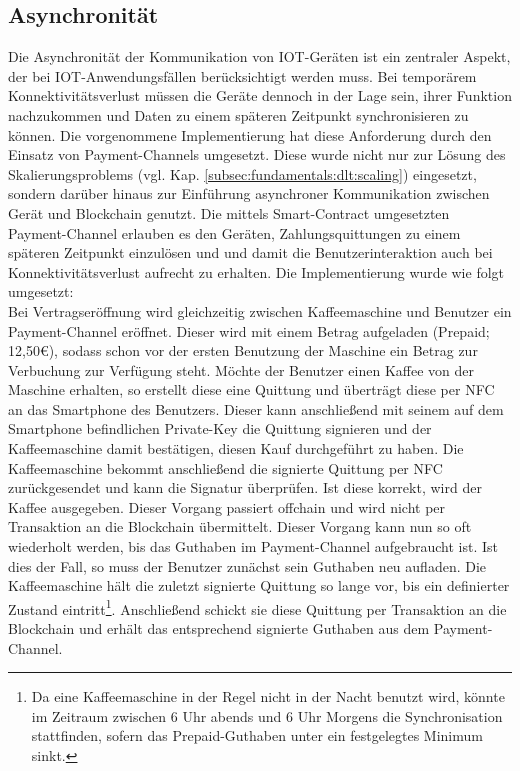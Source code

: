 \subsection{Asynchronität}
\label{subsec:implementation:requirements:async}
Die Asynchronität der Kommunikation von \ac{IOT}-Geräten ist ein zentraler Aspekt, der bei \ac{IOT}-Anwendungsfällen berücksichtigt werden muss. Bei temporärem Konnektivitätsverlust müssen die Geräte dennoch in der Lage sein, ihrer Funktion nachzukommen und Daten zu einem späteren Zeitpunkt synchronisieren zu können. Die vorgenommene Implementierung hat diese Anforderung durch den Einsatz von Payment-Channels umgesetzt. Diese wurde nicht nur zur Lösung des Skalierungsproblems (vgl. Kap. \ref{subsec:fundamentals:dlt:scaling}) eingesetzt, sondern darüber hinaus zur Einführung asynchroner Kommunikation zwischen Gerät und Blockchain genutzt. Die mittels Smart-Contract umgesetzten Payment-Channel erlauben es den Geräten, Zahlungsquittungen zu einem späteren Zeitpunkt einzulösen und und damit die Benutzerinteraktion auch bei Konnektivitätsverlust aufrecht zu erhalten. Die Implementierung wurde wie folgt umgesetzt:\\
Bei Vertragseröffnung wird gleichzeitig zwischen Kaffeemaschine und Benutzer ein Payment-Channel eröffnet. Dieser wird mit einem Betrag aufgeladen (Prepaid; 12,50€), sodass schon vor der ersten Benutzung der Maschine ein Betrag zur Verbuchung zur Verfügung steht. Möchte der Benutzer einen Kaffee von der Maschine erhalten, so erstellt diese eine Quittung und überträgt diese per \ac{NFC} an das Smartphone des Benutzers. Dieser kann anschließend mit seinem auf dem Smartphone befindlichen Private-Key die Quittung signieren und der Kaffeemaschine damit bestätigen, diesen Kauf durchgeführt zu haben. Die Kaffeemaschine bekommt anschließend die signierte Quittung per \ac{NFC} zurückgesendet und kann die Signatur überprüfen. Ist diese korrekt, wird der Kaffee ausgegeben. Dieser Vorgang passiert offchain und wird nicht per Transaktion an die Blockchain übermittelt. Dieser Vorgang kann nun so oft wiederholt werden, bis das Guthaben im Payment-Channel aufgebraucht ist. Ist dies der Fall, so muss der Benutzer zunächst sein Guthaben neu aufladen. Die Kaffeemaschine hält die zuletzt signierte Quittung so lange vor, bis ein definierter Zustand eintritt\footnote{Da eine Kaffeemaschine in der Regel nicht in der Nacht benutzt wird, könnte im Zeitraum zwischen 6 Uhr abends und 6 Uhr Morgens die Synchronisation stattfinden, sofern das Prepaid-Guthaben unter ein festgelegtes Minimum sinkt.}. Anschließend schickt sie diese Quittung per Transaktion an die Blockchain und erhält das entsprechend signierte Guthaben aus dem Payment-Channel.


